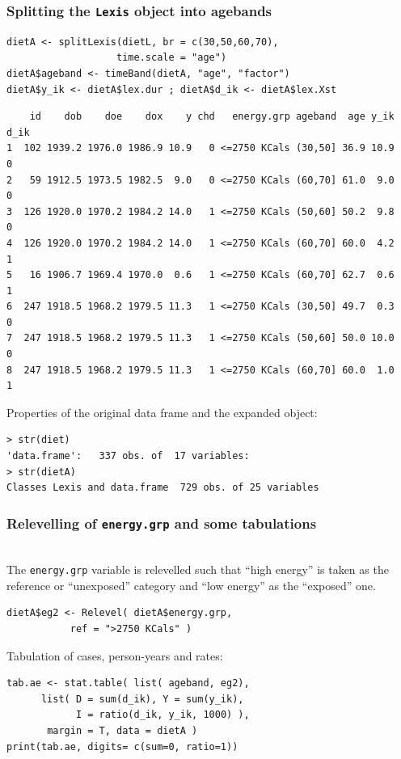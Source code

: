 \documentclass[handout,12pt]{beamer}
\begin{document}
\begin{frame}[fragile]
\frametitle{Splitting the \texttt{Lexis} object into agebands}
\small
\begin{verbatim}
dietA <- splitLexis(dietL, br = c(30,50,60,70), 
                   time.scale = "age")
dietA$ageband <- timeBand(dietA, "age", "factor")
dietA$y_ik <- dietA$lex.dur ; dietA$d_ik <- dietA$lex.Xst
\end{verbatim}
\scriptsize
\begin{verbatim}
    id    dob    doe    dox    y chd   energy.grp ageband  age y_ik d_ik
1  102 1939.2 1976.0 1986.9 10.9   0 <=2750 KCals (30,50] 36.9 10.9    0
2   59 1912.5 1973.5 1982.5  9.0   0 <=2750 KCals (60,70] 61.0  9.0    0
3  126 1920.0 1970.2 1984.2 14.0   1 <=2750 KCals (50,60] 50.2  9.8    0
4  126 1920.0 1970.2 1984.2 14.0   1 <=2750 KCals (60,70] 60.0  4.2    1
5   16 1906.7 1969.4 1970.0  0.6   1 <=2750 KCals (60,70] 62.7  0.6    1
6  247 1918.5 1968.2 1979.5 11.3   1 <=2750 KCals (30,50] 49.7  0.3    0
7  247 1918.5 1968.2 1979.5 11.3   1 <=2750 KCals (50,60] 50.0 10.0    0
8  247 1918.5 1968.2 1979.5 11.3   1 <=2750 KCals (60,70] 60.0  1.0    1
\end{verbatim}
\normalsize
Properties of the original data frame and the expanded object:
\small
\begin{verbatim}
> str(diet) 
'data.frame':   337 obs. of  17 variables:
> str(dietA)
Classes Lexis and data.frame  729 obs. of 25 variables
\end{verbatim}

\normalsize
\end{frame}



\begin{frame}[fragile]
 \frametitle{Relevelling of \texttt{energy.grp} and some tabulations}
\ \\
The \texttt{energy.grp} variable is relevelled such that
``high energy'' is taken as the reference or
``unexposed'' category and ``low energy'' as the ``exposed'' one.
 \small
 \begin{verbatim} 
dietA$eg2 <- Relevel( dietA$energy.grp, 
           ref = ">2750 KCals" )
\end{verbatim}
\normalsize
Tabulation of cases, person-years and rates: \small
\begin{verbatim}
tab.ae <- stat.table( list( ageband, eg2),
      list( D = sum(d_ik), Y = sum(y_ik),
            I = ratio(d_ik, y_ik, 1000) ),
       margin = T, data = dietA )
print(tab.ae, digits= c(sum=0, ratio=1))
\end{verbatim}
\normalsize
\end{frame} 
\end{document}
